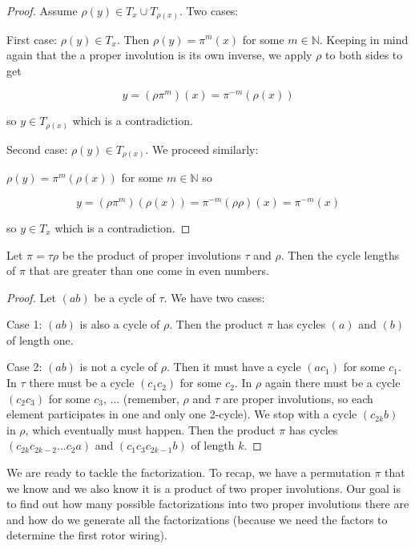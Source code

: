 \begin{proof}

Assume $\rho(y) \in T_x \cup T_{\rho(x)}$. Two cases:

First case: $\rho(y) \in T_x$. Then $\rho(y) = \pi^m(x)$ for some $m \in \mathbb{N}$. Keeping in mind again that the a proper involution is its own inverse, we apply $\rho$ to both sides to get

$$
y = (\rho \pi^m)(x) = \pi^{-m} (\rho(x))
$$

so $y \in T_{\rho(x)}$ which is a contradiction.

Second case: $\rho(y) \in T_{\rho(x)}$. We proceed similarly:

$\rho(y) = \pi^m(\rho(x))$ for some $m \in \mathbb{N}$ so

$$
y = (\rho \pi^m)(\rho(x)) = \pi^{-m} (\rho \rho)(x) = \pi^{-m} (x)
$$

so $y \in T_x$ which is a contradiction.

\end{proof}


\begin{thm}\label{involutionproduct4}
Let $\pi = \tau \rho$ be the product of proper involutions $\tau$ and $\rho$. Then the cycle lengths of $\pi$ that are greater than one come in even numbers.
\end{thm}

\begin{proof}

Let $(a b)$ be a cycle of $\tau$. We have two cases: 

Case 1: $(a b)$ is also a cycle of $\rho$. Then the product $\pi$ has cycles $(a)$ and $(b)$ of length one.

Case 2: $(a b)$ is not a cycle of $\rho$. Then it must have a cycle $(a c_{1})$ for some $c_{1}$. In $\tau$ there must be a cycle $(c_{1} c_{2})$ for some $c_{2}$. In $\rho$ again there must be a cycle $(c_{2} c_{3})$ for some $c_{3}$, $\ldots$ (remember, $\rho$ and $\tau$ are proper involutions, so each element participates in one and only one 2-cycle). We stop with a cycle $(c_{2k} b)$ in $\rho$, which eventually must happen. Then the product $\pi$ has cycles $(c_{2k} c_{2k - 2} \ldots c_{2} a)$ and $(c_{1} c_{3} c_{2k-1} b)$ of length $k$.

\end{proof}

We are ready to tackle the factorization. To recap, we have a permutation $\pi$ that we know and we also know it is a product of two proper involutions. Our goal is to find out how many possible factorizations into two proper involutions there are and how do we generate all the factorizations (because we need the factors to determine the first rotor wiring).

